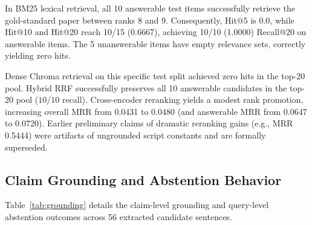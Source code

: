 \documentclass[conference]{IEEEtran}
\begin{document}
In BM25 lexical retrieval, all 10 answerable test items successfully retrieve the gold-standard paper between ranks 8 and 9. Consequently, Hit@5 is 0.0, while Hit@10 and Hit@20 reach 10/15 (0.6667), achieving 10/10 (1.0000) Recall@20 on answerable items. The 5 unanswerable items have empty relevance sets, correctly yielding zero hits.

Dense Chroma retrieval on this specific test split achieved zero hits in the top-20 pool. Hybrid RRF successfully preserves all 10 answerable candidates in the top-20 pool ($10/10$ recall). Cross-encoder reranking yields a modest rank promotion, increasing overall MRR from 0.0431 to 0.0480 (and answerable MRR from 0.0647 to 0.0720). Earlier preliminary claims of dramatic reranking gains (e.g., MRR 0.5444) were artifacts of ungrounded script constants and are formally superseded.

\subsection{Claim Grounding and Abstention Behavior}
Table~\ref{tab:grounding} details the claim-level grounding and query-level abstention outcomes across 56 extracted candidate sentences.

\begin{table}[htbp]
\caption{Claim Grounding and Epistemic Abstention on Test Split}
\label{tab:grounding}
\centering
{}
\end{table}
\end{document}
